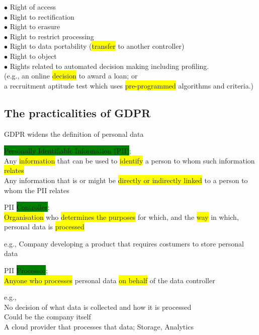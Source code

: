 \documentclass[tikz,border=10pt]{project_plan}
\newcommand{\bulletPoint}{\hspace{-3.1pt}$\bullet$ \hspace{5pt}}
\begin{document}
\bulletPoint Right of access \\
\bulletPoint Right to rectification\\
\bulletPoint Right to erasure\\
\bulletPoint Right to restrict processing\\
\bulletPoint Right to data portability (\colorbox{yellow}{transfer} to another controller)\\
\bulletPoint Right to object\\
\bulletPoint Rights related to automated decision making including profiling.\\
(e.g., an online \colorbox{yellow}{decision} to award a loan; or\\
a recruitment aptitude test which uses \colorbox{yellow}{pre-programmed} algorithms and criteria.)

\subsection{The practicalities of GDPR}

GDPR widens the definition of personal data

\colorbox{green}{Personally Identifiable Information (PII)};\\
Any \colorbox{yellow}{information} that can be used to \colorbox{yellow}{identify} a person to whom such information \colorbox{yellow}{relates}\\
Any information that is or might be \colorbox{yellow}{directly or indirectly linked} to a person to whom the PII relates

PII \colorbox{green}{Controller};\\
\colorbox{yellow}{Organisation} who \colorbox{yellow}{determines the purposes} for which, and the \colorbox{yellow}{way} in which, personal data is \colorbox{yellow}{processed}

e.g., Company developing a product that requires costumers to store personal data

PII \colorbox{green}{Processor};\\
\colorbox{yellow}{Anyone who processes} personal data \colorbox{yellow}{on behalf} of the data controller

e.g., \\
No decision of what data is collected and how it is processed\\
Could be the company itself\\
A cloud provider that processes that data; Storage, Analytics
\end{document}
